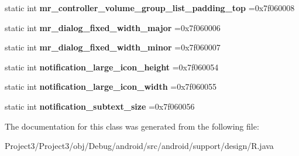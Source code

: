 \begin{DoxyCompactItemize}
static int {\bfseries mr\+\_\+controller\+\_\+volume\+\_\+group\+\_\+list\+\_\+padding\+\_\+top} =0x7f060008
\item 
\mbox{\label{classandroid_1_1support_1_1design_1_1R_1_1dimen_af4635de4bbeff96e0871f8bee34a22f4}} 
static int {\bfseries mr\+\_\+dialog\+\_\+fixed\+\_\+width\+\_\+major} =0x7f060006
\item 
\mbox{\label{classandroid_1_1support_1_1design_1_1R_1_1dimen_ac5504e543b83ce90b82ef93ff67523d9}} 
static int {\bfseries mr\+\_\+dialog\+\_\+fixed\+\_\+width\+\_\+minor} =0x7f060007
\item 
\mbox{\label{classandroid_1_1support_1_1design_1_1R_1_1dimen_a3f95eb208f1e4ea533770879523ef93f}} 
static int {\bfseries notification\+\_\+large\+\_\+icon\+\_\+height} =0x7f060054
\item 
\mbox{\label{classandroid_1_1support_1_1design_1_1R_1_1dimen_aa4594b34fbc1a464d3117b73a7e36a1f}} 
static int {\bfseries notification\+\_\+large\+\_\+icon\+\_\+width} =0x7f060055
\item 
\mbox{\label{classandroid_1_1support_1_1design_1_1R_1_1dimen_a770848c27171be8fc6374677edaaf80a}} 
static int {\bfseries notification\+\_\+subtext\+\_\+size} =0x7f060056
\end{DoxyCompactItemize}


The documentation for this class was generated from the following file\+:\begin{DoxyCompactItemize}
\item 
Project3/\+Project3/obj/\+Debug/android/src/android/support/design/R.\+java\end{DoxyCompactItemize}
